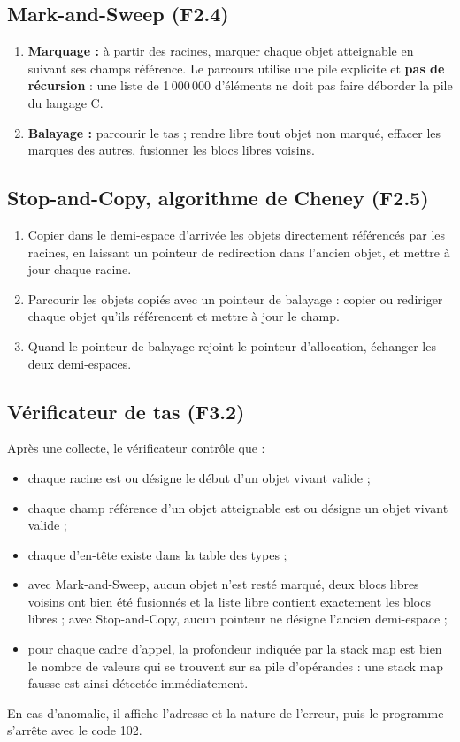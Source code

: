 \documentclass[11pt,a4paper]{article}
\newcommand{\code}[1]{\texttt{\detokenize{#1}}}
\begin{document}
\subsection{Mark-and-Sweep (F2.4)}
\begin{enumerate}
  \item \textbf{Marquage :} à partir des racines, marquer chaque objet atteignable en suivant ses champs référence. Le parcours utilise une pile explicite et \textbf{pas de récursion} : une liste de 1\,000\,000 d'éléments ne doit pas faire déborder la pile du langage C.
  \item \textbf{Balayage :} parcourir le tas ; rendre libre tout objet non marqué, effacer les marques des autres, fusionner les blocs libres voisins.
\end{enumerate}

\subsection{Stop-and-Copy, algorithme de Cheney (F2.5)}
\begin{enumerate}
  \item Copier dans le demi-espace d'arrivée les objets directement référencés par les racines, en laissant un pointeur de redirection dans l'ancien objet, et mettre à jour chaque racine.
  \item Parcourir les objets copiés avec un pointeur de balayage : copier ou rediriger chaque objet qu'ils référencent et mettre à jour le champ.
  \item Quand le pointeur de balayage rejoint le pointeur d'allocation, échanger les deux demi-espaces.
\end{enumerate}

\subsection{Vérificateur de tas (F3.2)}
Après une collecte, le vérificateur contrôle que :
\begin{itemize}
  \item chaque racine est \code{null} ou désigne le début d'un objet vivant valide ;
  \item chaque champ référence d'un objet atteignable est \code{null} ou désigne un objet vivant valide ;
  \item chaque \code{type_id} d'en-tête existe dans la table des types ;
  \item avec Mark-and-Sweep, aucun objet n'est resté marqué, deux blocs libres voisins ont bien été fusionnés et la liste libre contient exactement les blocs libres ; avec Stop-and-Copy, aucun pointeur ne désigne l'ancien demi-espace ;
  \item pour chaque cadre d'appel, la profondeur indiquée par la stack map est bien le nombre de valeurs qui se trouvent sur sa pile d'opérandes : une stack map fausse est ainsi détectée immédiatement.
\end{itemize}
En cas d'anomalie, il affiche l'adresse et la nature de l'erreur, puis le programme s'arrête avec le code 102.
\end{document}
